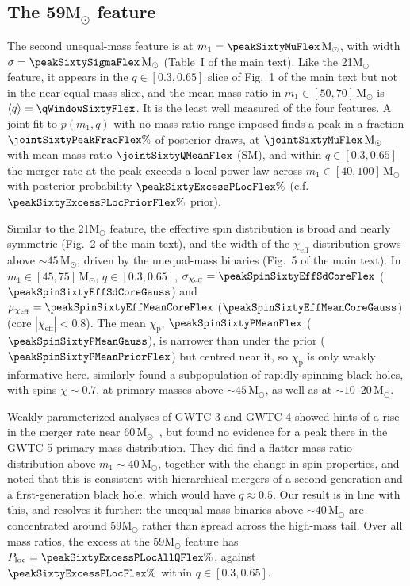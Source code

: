 \documentclass[%
 onecolumn,
 amsmath,amssymb,
 aps,
 prl,
 nofootinbib,nobibnotes,
]{revtex4-2}
\newcommand{\Msun}{\ensuremath{\mathrm{M}_{\odot}}}
\newcommand{\chieff}{\ensuremath{\chi_{\mathrm{eff}}}}
\newcommand{\chip}{\ensuremath{\chi_{\mathrm{p}}}}
\newcommand{\red}[1]{{\color{Red} #1}}
\newcommand{\featTwenty}{21\xspace}
\newcommand{\featSixty}{59\xspace}
\begin{document}
\subsection{The \featSixty $\Msun$ feature}

The second unequal-mass feature is at $m_1 = \peakSixtyMuFlex\,\Msun$, with width $\sigma = \peakSixtySigmaFlex\,\Msun$ (Table~I of the main text). Like the \featTwenty $\Msun$ feature, it appears in the $q \in [0.3, 0.65]$ slice of Fig.~1 of the main text but not in the near-equal-mass slice, and the mean mass ratio in $m_1 \in [50, 70]\,\Msun$ is $\langle q \rangle = \qWindowSixtyFlex$. It is the least well measured of the four features. A joint fit to $p(m_1, q)$ with no mass ratio range imposed finds a peak in a fraction $\jointSixtyPeakFracFlex\%$ of posterior draws, at $\jointSixtyMuFlex\,\Msun$ with mean mass ratio $\jointSixtyQMeanFlex$ (SM), and within $q \in [0.3, 0.65]$ the merger rate at the peak exceeds a local power law across $m_1 \in [40, 100]\,\Msun$ with posterior probability $\peakSixtyExcessPLocFlex\%$ (c.f. $\peakSixtyExcessPLocPriorFlex\%$ prior).

Similar to the \featTwenty $\Msun$ feature, the effective spin distribution is broad and nearly symmetric (Fig.~2 of the main text), and the width of the $\chieff$ distribution grows above $\sim 45\,\Msun$, driven by the unequal-mass binaries (Fig.~5 of the main text). \red{In $m_1 \in [45, 75]\,\Msun$, $q \in [0.3, 0.65]$, $\sigma_{\chieff} = \peakSpinSixtyEffSdCoreFlex$ ($\peakSpinSixtyEffSdCoreGauss$) and $\mu_{\chieff} = \peakSpinSixtyEffMeanCoreFlex$ ($\peakSpinSixtyEffMeanCoreGauss$) (core $|\chieff| < 0.8$). The mean $\chip$, $\peakSpinSixtyPMeanFlex$ ($\peakSpinSixtyPMeanGauss$), is narrower than under the prior ($\peakSpinSixtyPMeanPriorFlex$) but centred near it, so $\chip$ is only weakly informative here.} \citet{LIGOScientific:2026ctl} similarly found a subpopulation of rapidly spinning black holes, with spins $\chi \sim 0.7$, at primary masses above $\sim 45\,\Msun$, as well as at $\sim 10$--$20\,\Msun$.

Weakly parameterized analyses of \ac{GWTC-3} and \ac{GWTC-4} showed hints of a rise in the merger rate near $60\,\Msun$~\cite{MaganaHernandez:2024uty, LIGOScientific:2025pvj}, but \citet{LIGOScientific:2026ctl} found no evidence for a peak there in the \ac{GWTC-5} primary mass distribution. They did find a flatter mass ratio distribution above $m_1 \sim 40\,\Msun$, together with the change in spin properties, and noted that this is consistent with hierarchical mergers of a second-generation and a first-generation black hole, which would have $q \approx 0.5$. Our result is in line with this, and resolves it further: the unequal-mass binaries above $\sim 40\,\Msun$ are concentrated around \featSixty $\Msun$ rather than spread across the high-mass tail. \red{Over all mass ratios, the excess at the \featSixty $\Msun$ feature has $P_{\rm loc} = \peakSixtyExcessPLocAllQFlex\%$, against $\peakSixtyExcessPLocFlex\%$ within $q \in [0.3, 0.65]$.}
\end{document}
